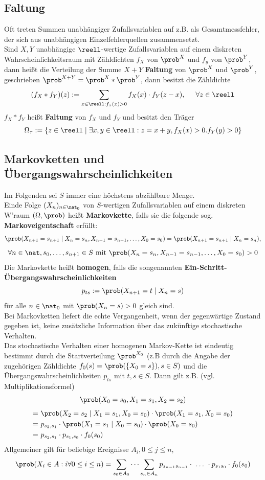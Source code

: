 \documentclass{kit}
\begin{document}
  \subsection{Faltung}
    Oft treten Summen unabhängiger Zufallsvariablen auf z.B. als Gesamtmessfehler, der sich aus unabhängigen
    Einzelfehlerquellen zusammensetzt.\\
    Sind $X,Y$ unabhängige $\reell$-wertige Zufallsvariablen auf einem diskreten Wahrscheinlichkeitsraum mit Zähldichten
    $f_X$ von $\prob^X$ und $f_y$ von $\prob^Y$, dann heißt die Verteilung der Summe $X+Y$ \textbf{Faltung} von $\prob^X$
    und $\prob^Y$, geschrieben $\prob^{X+Y}=\prob^X*\prob^Y$, dann besitzt die Zähldichte
    $$(f_X*f_Y)(z):=\sum_{x\in\reell:f_x(x)>0}f_X(x)\cdot f_Y(z-x),\hspace{0.5cm}\forall z\in\reell$$
    $f_X*f_Y$ heißt \textbf{Faltung} von $f_X$ und $f_Y$ und besitzt den Träger
    $$\Omega_\tau:=\{z\in\reell\mid\exists x,y\in\reell:z=x+y,f_X(x)>0.f_Y(y)>0\}$$
  \subsection{Markovketten und Übergangswahrscheinlichkeiten}
    Im Folgenden sei $S$ immer eine höchstens abzählbare Menge.\\
    Einde Folge $(X_n)_{n\in\nat_0}$ von $S$-wertigen Zufallsvariablen auf einem diskreten W'raum $(\Omega,\prob)$ heißt
    \textbf{Markovkette}, falls sie die folgende sog. \textbf{Markoveigentschaft} erfüllt:
    $$\prob(X_{n+1}=s_{n+1}\mid X_n=s_n,X_{n-1}=s_{n-1},\dots,X_0=s_0)=\prob(X_{n+1}=s_{n+1}\mid X_n=s_n),$$
    $$\forall n\in\nat,s_0,\dots,s_{n+1}\in S\text{ mit }\prob(X_n=s_n,X_{n-1}=s_{n-1},\dots,X_0=s_0)>0$$
    Die Markovkette heißt \textbf{homogen}, falls die songenannten \textbf{Ein-Schritt-}\\
    \textbf{Übergangswahrscheinlichkeiten}
    $$p_{ts}:=\prob(X_{n+1}=t\mid X_n=s)$$
    für alle $n\in\nat_0$ mit $\prob(X_n=s)>0$ gleich sind.\\
    Bei Markovketten liefert die echte Vergangenheit, wenn der gegenwärtige Zustand gegeben ist, keine zusätzliche
    Information über das zukünftige stochastische Verhalten.\\
    Das stochastische Verhalten einer homogenen Markov-Kette ist eindeutig bestimmt durch die Startverteilung 
    $\prob^{X_0}$ (z.B durch die Angabe der zugehörigen Zähldichte $f_0(s)=\prob(\{X_0=s\}),s\in S)$ und die
    Übergangswahrscheinlichkeiten $p_{ts}$ mit $t,s\in S$. Dann gilt z.B. (vgl. Multiplikationsformel)
    $$\prob(X_0=s_0,X_1=s_1,X_2=s_2)$$
    $$\begin{aligned}
      = & \ \prob(X_2=s_2\mid X_1=s_1,X_0=s_0)\cdot\prob(X_1=s_1,X_0=s_0)\\
      = & \ p_{s_2,s_1}\cdot\prob(X_1=s_1\mid X_0=s_0)\cdot\prob(X_0=s_0)\\
      = & \ p_{s_2,s_1}\cdot p_{s_1,s_0}\cdot f_0(s_0)
    \end{aligned}$$
    Allgemeiner gilt für beliebige Ereignisse $A_i,0\le j\le n$,
    $$\prob(X_i\in A:i\forall0\le i\le n)=\sum_{s_0\in A_0}\cdots\sum_{s_n\in A_n}p_{s_{n-1}s_{n-1}}\cdot \ \dots \ \cdot
    p_{s_1s_0}\cdot f_0(s_0)$$
\end{document}
